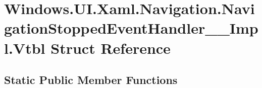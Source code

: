 \hypertarget{struct_windows_1_1_u_i_1_1_xaml_1_1_navigation_1_1_navigation_stopped_event_handler_____impl_1_1_vtbl}{}\section{Windows.\+U\+I.\+Xaml.\+Navigation.\+Navigation\+Stopped\+Event\+Handler\+\_\+\+\_\+\+Impl.\+Vtbl Struct Reference}
\label{struct_windows_1_1_u_i_1_1_xaml_1_1_navigation_1_1_navigation_stopped_event_handler_____impl_1_1_vtbl}
\subsection*{Static Public Member Functions}
